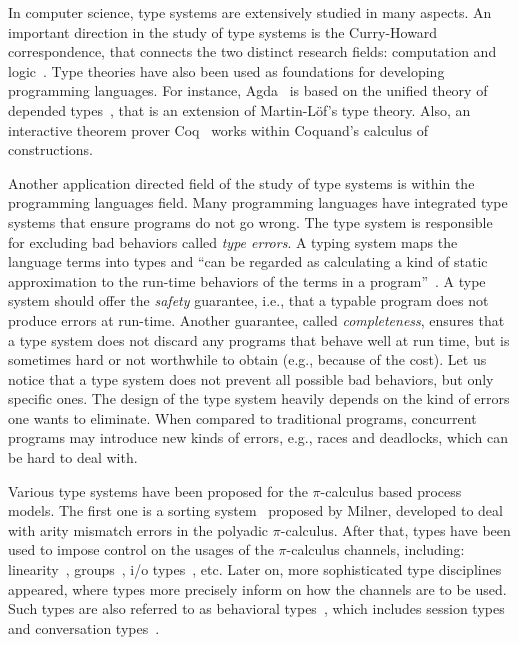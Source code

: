 In computer science, type systems are extensively studied in many aspects. An important direction in the study of type systems is the Curry-Howard correspondence, that connects the two distinct research fields: computation and logic~\cite{ DBLP:journals/mscs/CairesPT16, curry1934functionality,  girard1989proofs, howard1980formulae, DBLP:journals/cacm/Wadler15}. Type theories have also been used as foundations for developing programming languages. For instance, Agda~\cite{DBLP:conf/tphol/BoveDN09} is based on the unified theory of depended types~\cite{DBLP:books/daglib/0078470}, that is an extension of Martin-L\" of's type theory. Also, an interactive theorem prover Coq~\cite{DBLP:series/txtcs/BertotC04} works within Coquand's calculus of constructions.   

Another application directed field of the study of type systems is within the programming languages field. Many programming languages have integrated type systems that ensure programs do not go wrong. The type system is responsible for excluding bad behaviors called \emph{type errors}. A typing system maps the language terms into types and ``can be regarded
as calculating a kind of static approximation to the run-time behaviors of the
terms in a program''~\cite{DBLP:books/daglib/0005958}. A type system should offer the \emph{safety} guarantee, i.e., that a typable program does not produce errors at run-time. Another guarantee, called \emph{completeness},  ensures that a type system does not discard any programs that behave well at run time, but is sometimes hard or not worthwhile to obtain (e.g., because of the cost). 
Let us notice that a type system does not prevent all possible bad behaviors, but only specific ones.
The design of the type system heavily depends on the kind of errors one wants to eliminate. 
When compared to traditional programs,  concurrent programs may introduce new kinds of errors, e.g., races and deadlocks, which can be hard to deal with.

Various type systems have been proposed for the $\pi$-calculus based process models. The first one is a sorting system~\cite{DBLP:conf/concur/Milner92} proposed by Milner, developed to deal with arity mismatch errors in the polyadic $\pi$-calculus. After that, types have been used to impose control on the usages of the $\pi$-calculus channels, including: linearity~\cite{DBLP:journals/toplas/KobayashiPT99}, groups~\cite{cardelli05}, i/o types~\cite{DBLP:journals/mscs/PierceS96}, etc. Later on, more sophisticated type disciplines appeared, where types  more precisely inform on how the channels are to be used. Such types are also referred to as behavioral types~\cite{bettyreport}, which includes session types~\cite{DBLP:conf/concur/CarboneHY08, DBLP:conf/esop/HondaVK98,  DBLP:journals/pacmpl/ScalasY19} and conversation types~\cite{DBLP:journals/tcs/CairesV10}. 

